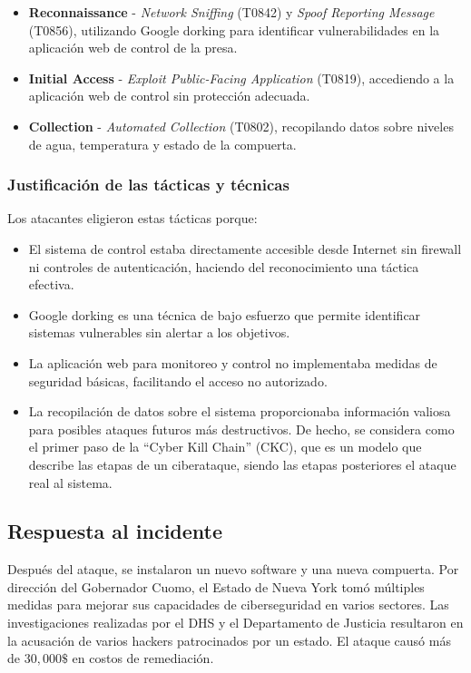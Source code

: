 \begin{itemize}
    \item \textbf{Reconnaissance} - \textit{Network Sniffing} (T0842) y \textit{Spoof Reporting Message} (T0856), utilizando Google dorking para identificar vulnerabilidades en la aplicación web de control de la presa.
    
    \item \textbf{Initial Access} - \textit{Exploit Public-Facing Application} (T0819), accediendo a la aplicación web de control sin protección adecuada.
    
    \item \textbf{Collection} - \textit{Automated Collection} (T0802), recopilando datos sobre niveles de agua, temperatura y estado de la compuerta.
\end{itemize}

\subsubsection{Justificación de las tácticas y técnicas}
Los atacantes eligieron estas tácticas porque:

\begin{itemize}
    \item El sistema de control estaba directamente accesible desde Internet sin firewall ni controles de autenticación, haciendo del reconocimiento una táctica efectiva.
        
        \item Google dorking es una técnica de bajo esfuerzo que permite identificar sistemas vulnerables sin alertar a los objetivos.
        
        \item La aplicación web para monitoreo y control no implementaba medidas de seguridad básicas, facilitando el acceso no autorizado.
        
        \item La recopilación de datos sobre el sistema proporcionaba información valiosa para posibles ataques futuros más destructivos.
        De hecho, se considera como el primer paso de la ``Cyber Kill Chain'' (CKC), que es un modelo que describe las etapas de un ciberataque, siendo las etapas posteriores el ataque real al sistema.
\end{itemize}

\subsection{Respuesta al incidente}
Después del ataque, se instalaron un nuevo software y una nueva compuerta. Por dirección del Gobernador Cuomo, el Estado de Nueva York tomó múltiples medidas para mejorar sus capacidades de ciberseguridad en varios sectores. Las investigaciones realizadas por el DHS y el Departamento de Justicia resultaron en la acusación de varios hackers patrocinados por un estado. El ataque causó más de $30,000\$$ en costos de remediación.

